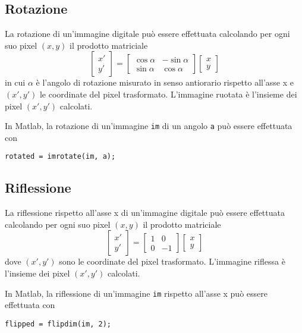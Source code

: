 \subsection{Rotazione}
La rotazione di un'immagine digitale può essere effettuata calcolando per ogni suo pixel $(x,y)$ il prodotto matriciale
\begin{equation*}
\begin{bmatrix}
x' \\
y'
\end{bmatrix} = 
\begin{bmatrix}
\cos\alpha & -\sin\alpha \\
\sin\alpha & \cos\alpha
\end{bmatrix}
\begin{bmatrix}
x \\
y
\end{bmatrix}
\end{equation*}
in cui $\alpha$ è l’angolo di rotazione misurato in senso antiorario rispetto all’asse x e $(x',y')$ le coordinate del pixel trasformato. L'immagine ruotata è l'insieme dei pixel $(x',y')$ calcolati.

In Matlab, la rotazione di un'immagine \verb|im| di un angolo \verb|a| può essere effettuata con
\begin{verbatim}
rotated = imrotate(im, a);
\end{verbatim}

\subsection{Riflessione}
La riflessione rispetto all’asse x di un'immagine digitale può essere effettuata calcolando per ogni suo pixel $(x,y)$ il prodotto matriciale
\begin{equation*}
\begin{bmatrix}
x' \\
y'
\end{bmatrix} = 
\begin{bmatrix}
1 & 0 \\
0 & -1
\end{bmatrix}
\begin{bmatrix}
x \\
y
\end{bmatrix}
\end{equation*}
dove $(x',y')$ sono le coordinate del pixel trasformato. L'immagine riflessa è l'insieme dei pixel $(x',y')$ calcolati.

In Matlab, la riflessione di un'immagine \verb|im| rispetto all'asse x può essere effettuata con
\begin{verbatim}
flipped = flipdim(im, 2);
\end{verbatim}

